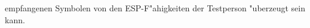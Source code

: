 \begin{loesung}
\begin{teilaufgaben}
empfangenen Symbolen von den ESP-F"ahigkeiten der Testperson
"uberzeugt sein kann.
\qedhere
\end{teilaufgaben}
\end{loesung}
